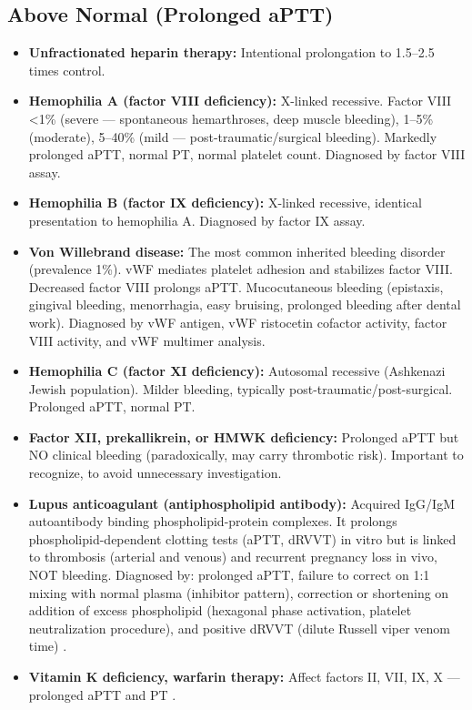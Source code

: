 \subsection*{Above Normal (Prolonged aPTT)}
\begin{itemize}
  \item \textbf{Unfractionated heparin therapy:} Intentional prolongation to 1.5--2.5 times control.
  \item \textbf{Hemophilia A (factor VIII deficiency):} X-linked recessive. Factor VIII <1\% (severe --- spontaneous hemarthroses, deep muscle bleeding), 1--5\% (moderate), 5--40\% (mild --- post-traumatic/surgical bleeding). Markedly prolonged aPTT, normal PT, normal platelet count. Diagnosed by factor VIII assay.
  \item \textbf{Hemophilia B (factor IX deficiency):} X-linked recessive, identical presentation to hemophilia A. Diagnosed by factor IX assay.
  \item \textbf{Von Willebrand disease:} The most common inherited bleeding disorder (prevalence 1\%). vWF mediates platelet adhesion and stabilizes factor VIII. Decreased factor VIII prolongs aPTT. Mucocutaneous bleeding (epistaxis, gingival bleeding, menorrhagia, easy bruising, prolonged bleeding after dental work). Diagnosed by vWF antigen, vWF ristocetin cofactor activity, factor VIII activity, and vWF multimer analysis.
  \item \textbf{Hemophilia C (factor XI deficiency):} Autosomal recessive (Ashkenazi Jewish population). Milder bleeding, typically post-traumatic/post-surgical. Prolonged aPTT, normal PT.
  \item \textbf{Factor XII, prekallikrein, or HMWK deficiency:} Prolonged aPTT but NO clinical bleeding (paradoxically, may carry thrombotic risk). Important to recognize, to avoid unnecessary investigation.
  \item \textbf{Lupus anticoagulant (antiphospholipid antibody):} Acquired IgG/IgM autoantibody binding phospholipid-protein complexes. It prolongs phospholipid-dependent clotting tests (aPTT, dRVVT) in vitro but is linked to thrombosis (arterial and venous) and recurrent pregnancy loss in vivo, NOT bleeding. Diagnosed by: prolonged aPTT, failure to correct on 1:1 mixing with normal plasma (inhibitor pattern), correction or shortening on addition of excess phospholipid (hexagonal phase activation, platelet neutralization procedure), and positive dRVVT (dilute Russell viper venom time) \cite{devreese2018laboratory}.
  \item \textbf{Vitamin K deficiency, warfarin therapy:} Affect factors II, VII, IX, X --- prolonged aPTT and PT \cite{keeling2011guidelines}.

\end{itemize}
